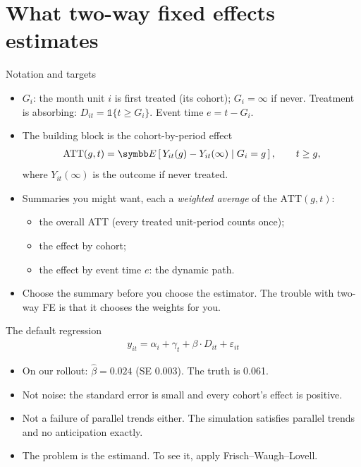 \documentclass[aspectratio=169,11pt]{beamer}
\begin{document}
\section{What two-way fixed effects estimates}

\begin{frame}{Notation and targets}
\begin{itemize}
	\item $G_i$: the month unit $i$ is first treated (its \alert{cohort}); $G_i = \infty$ if never. Treatment is
	absorbing: $D_{it} = \mathbb{1}\{t \ge G_i\}$. Event time $e = t - G_i$.
	\medskip
	\item The building block is the cohort-by-period effect
	\begin{align*}
		\text{ATT}(g, t) = \E\left[\,Y_{it}(g) - Y_{it}(\infty) \mid G_i = g\,\right], \qquad t \ge g,
	\end{align*}
	where $Y_{it}(\infty)$ is the outcome if never treated.
	\item Summaries you might want, each a \emph{weighted average} of the $\text{ATT}(g,t)$:
	\begin{itemize}
		\item the overall ATT (every treated unit-period counts once);
		\item the effect by cohort;
		\item the effect by event time $e$: the dynamic path.
	\end{itemize}
	\medskip
	\item \alert{Choose the summary before you choose the estimator.} The trouble with two-way FE is that it chooses
	the weights for you.
\end{itemize}
\end{frame}


\begin{frame}{The default regression}
\begin{align*}
	y_{it} = \alpha_i + \gamma_t + \beta \cdot D_{it} + \varepsilon_{it}
\end{align*}
\begin{itemize}
	\item On our rollout: $\hat\beta = 0.024$ (SE 0.003). The truth is 0.061.
	\medskip
	\item Not noise: the standard error is small and every cohort's effect is positive.
	\medskip
	\item Not a failure of parallel trends either. The simulation satisfies parallel trends and no anticipation exactly.
	\medskip
	\item The problem is the \alert{estimand}. To see it, apply Frisch--Waugh--Lovell.
\end{itemize}
\end{frame}
\end{document}
